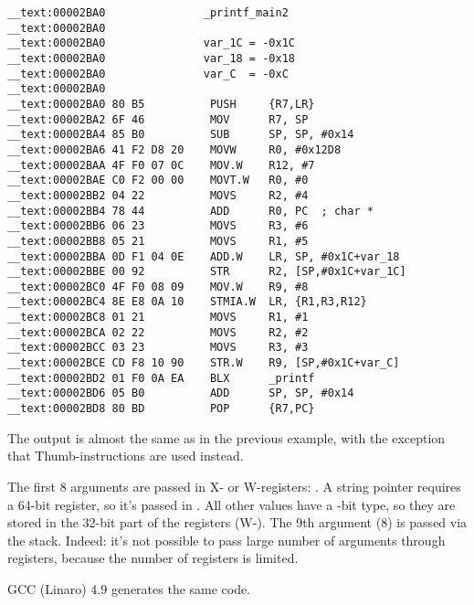 \myparagraph{\OptimizingXcodeIV: \ThumbTwoMode}

\begin{lstlisting}
__text:00002BA0               _printf_main2
__text:00002BA0
__text:00002BA0               var_1C = -0x1C
__text:00002BA0               var_18 = -0x18
__text:00002BA0               var_C  = -0xC
__text:00002BA0
__text:00002BA0 80 B5          PUSH     {R7,LR}
__text:00002BA2 6F 46          MOV      R7, SP
__text:00002BA4 85 B0          SUB      SP, SP, #0x14
__text:00002BA6 41 F2 D8 20    MOVW     R0, #0x12D8
__text:00002BAA 4F F0 07 0C    MOV.W    R12, #7
__text:00002BAE C0 F2 00 00    MOVT.W   R0, #0
__text:00002BB2 04 22          MOVS     R2, #4
__text:00002BB4 78 44          ADD      R0, PC  ; char *
__text:00002BB6 06 23          MOVS     R3, #6
__text:00002BB8 05 21          MOVS     R1, #5
__text:00002BBA 0D F1 04 0E    ADD.W    LR, SP, #0x1C+var_18
__text:00002BBE 00 92          STR      R2, [SP,#0x1C+var_1C]
__text:00002BC0 4F F0 08 09    MOV.W    R9, #8
__text:00002BC4 8E E8 0A 10    STMIA.W  LR, {R1,R3,R12}
__text:00002BC8 01 21          MOVS     R1, #1
__text:00002BCA 02 22          MOVS     R2, #2
__text:00002BCC 03 23          MOVS     R3, #3
__text:00002BCE CD F8 10 90    STR.W    R9, [SP,#0x1C+var_C]
__text:00002BD2 01 F0 0A EA    BLX      _printf
__text:00002BD6 05 B0          ADD      SP, SP, #0x14
__text:00002BD8 80 BD          POP      {R7,PC}
\end{lstlisting}

The output is almost the same as in the previous example, with the exception that Thumb-instructions are used instead.





The first 8 arguments are passed in X- or W-registers: \ARMPCS.
A string pointer requires a 64-bit register, so it's passed in .
All other values have a -bit type, so they are stored in the 32-bit part of the registers (W-).
The 9th argument (8) is passed via the stack.
Indeed: it's not possible to pass large number of arguments through registers, because the number of registers is limited.

\Optimizing GCC (Linaro) 4.9 generates the same code.
